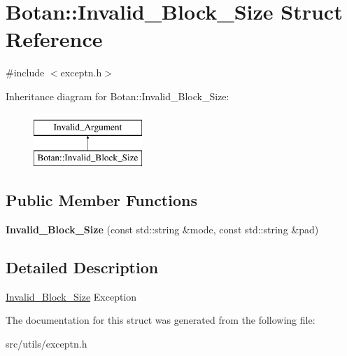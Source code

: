 \hypertarget{structBotan_1_1Invalid__Block__Size}{\section{Botan\-:\-:Invalid\-\_\-\-Block\-\_\-\-Size Struct Reference}
\label{structBotan_1_1Invalid__Block__Size}
}


{\ttfamily \#include $<$exceptn.\-h$>$}

Inheritance diagram for Botan\-:\-:Invalid\-\_\-\-Block\-\_\-\-Size\-:\begin{figure}[H]
\begin{center}
\leavevmode
\includegraphics[height=2.000000cm]{structBotan_1_1Invalid__Block__Size}
\end{center}
\end{figure}
\subsection*{Public Member Functions}
\begin{DoxyCompactItemize}
\item 
\hypertarget{structBotan_1_1Invalid__Block__Size_a9cc6112c0844098a6fd4313077f8c744}{{\bfseries Invalid\-\_\-\-Block\-\_\-\-Size} (const std\-::string \&mode, const std\-::string \&pad)}\label{structBotan_1_1Invalid__Block__Size_a9cc6112c0844098a6fd4313077f8c744}

\end{DoxyCompactItemize}


\subsection{Detailed Description}
\hyperlink{structBotan_1_1Invalid__Block__Size}{Invalid\-\_\-\-Block\-\_\-\-Size} Exception 

The documentation for this struct was generated from the following file\-:\begin{DoxyCompactItemize}
\item 
src/utils/exceptn.\-h\end{DoxyCompactItemize}
